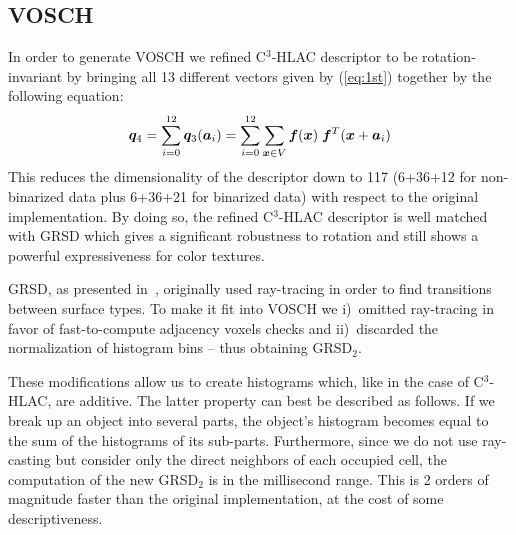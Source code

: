 \documentclass[a4paper, 10 pt, conference]{sty/ieeeconf}
\begin{document}
\subsection{VOSCH}
\label{sec:VOSCH}
In order to generate VOSCH we refined C$^3$-HLAC descriptor to be rotation-invariant by bringing all  
13 different vectors given by (\ref{eq:1st}) together by the following equation: 
\begin{equation}\label{eq:1st_new}
  {\bm q_4} = \sum_{i=0}^{12} {\bm q_3}({\bm a}_i) = \sum_{i=0}^{12}\sum_{{\bm x} \in V} \bm{f}({\bm x}) \hspace{1mm}\bm{f}^T({\bm x}+{\bm a_i}) \\
\end{equation}
%
This reduces the dimensionality of the descriptor down to 117 (6+36+12 for non-binarized data plus 6+36+21 
for binarized data) with respect to the original implementation. 
By doing so, the refined C$^3$-HLAC descriptor is well matched with GRSD which gives a significant 
robustness to rotation and still shows a powerful expressiveness for color textures.

GRSD, as presented in~\cite{GRSD10Humanoids}, originally used
ray-tracing in order to find transitions between surface types. To make it fit into VOSCH 
we i)~omitted ray-tracing in favor of fast-to-compute adjacency voxels checks and ii)~discarded
the normalization of histogram bins -- thus obtaining GRSD$_2$.

These modifications allow us to create histograms which, like in the case of C$^3$-HLAC, are additive.
The latter property can best be described as follows. 
If we break up an object into several parts, 
the object's histogram becomes equal to the sum of the histograms of its sub-parts. 
%
%
 Furthermore, since we do not use ray-casting but 
consider only the direct neighbors of each occupied cell, the computation of the new GRSD$_2$ is in 
the millisecond range. This is 2 orders of magnitude faster than the original implementation,
at the cost of some descriptiveness.
\end{document}
